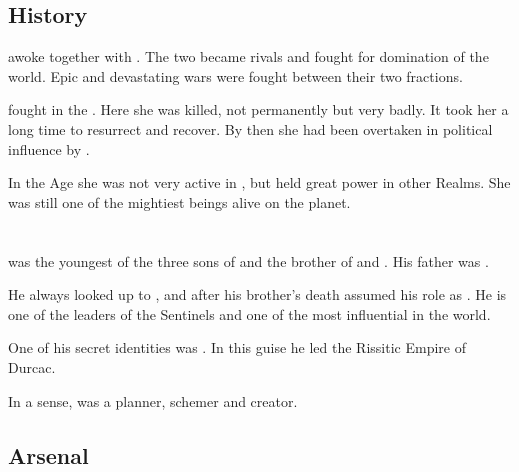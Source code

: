 \subsection{History}
\Rephexsar awoke together with \Nexagglachel. 
The two became rivals and fought for domination of the world.
Epic and devastating wars were fought between their two fractions. 

\Rephexsar fought in the \secondbanewar. 
Here she was killed, not permanently but very badly. 
It took her a long time to resurrect and recover. 
By then she had been overtaken in political influence by \Secherdamon. 

In the \Scatha Age she was not very active in \Azmith, but held great power in other Realms.
She was still one of the mightiest beings alive on the planet. 















\section{\IrocasSecherdamon}
\index{\Secherdamon}
\index{\IrocasSecherdamon}
\IrocasSecherdamon{} was the youngest of the three sons of {\Tiamat} and the brother of \Ishnaruchaefir and \Nexagglachel. 
His father was .

He always looked up to \Nexagglachel, and after his brother's death \Secherdamon{} assumed his role as \dragonking. He is one of the leaders of the Sentinels and one of the most influential \dragons{} in the world.

One of his secret identities was \HriistN. 
In this guise he led the Rissitic Empire of Durcac. 

In a sense, \Secherdamon{} was a planner, schemer and creator. 









\subsection{Arsenal}





